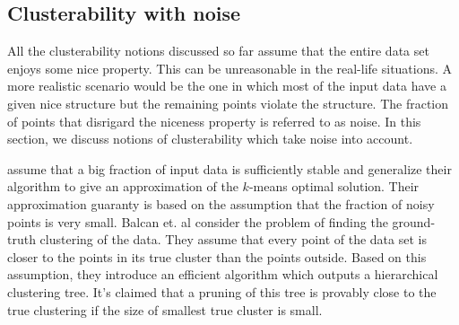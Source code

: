 \documentclass[twoside]{article}
\newcommand{\mc}{\mathcal}
\newtheorem{definition}[theorem]{Definition}
\begin{document}

\subsection{Clusterability with noise}
All the clusterability notions discussed so far assume that the entire data set enjoys some nice property. This can be unreasonable in the real-life situations. A more realistic scenario would be the one in which most of the input data have a given nice structure but the remaining points violate the structure. The fraction of points that disrigard the niceness property is referred to as noise.
In this section, we discuss notions of clusterability which take noise into account. 



\cite{balcan2012clustering} assume that a big fraction of input data is sufficiently stable and generalize their algorithm to give an approximation of the $k$-means optimal solution. Their approximation guaranty is based on the assumption that the fraction of noisy points is very small.
Balcan et. al \cite{balcan2008discriminative} consider the problem of finding the ground-truth clustering of the data. They assume that every point of the data set is closer to the points in its true cluster than the points outside. Based on this assumption, they introduce an efficient algorithm which outputs a hierarchical clustering tree. It's claimed that a pruning of this tree is provably close to the true clustering if the size of smallest true cluster is small.
\end{document}
